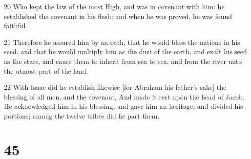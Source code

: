 \par 20 Who kept the law of the most High, and was in covenant with him: he established the covenant in his flesh; and when he was proved, he was found faithful.
\par 21 Therefore he assured him by an oath, that he would bless the nations in his seed, and that he would multiply him as the dust of the earth, and exalt his seed as the stars, and cause them to inherit from sea to sea, and from the river unto the utmost part of the land.
\par 22 With Isaac did he establish likewise [for Abraham his father's sake] the blessing of all men, and the covenant, And made it rest upon the head of Jacob. He acknowledged him in his blessing, and gave him an heritage, and divided his portions; among the twelve tribes did he part them.

\chapter{45}

